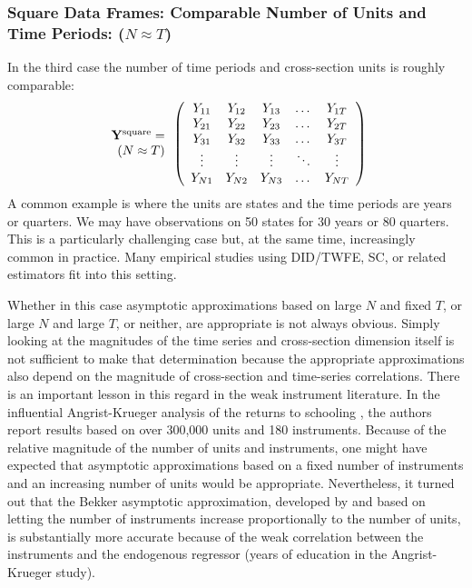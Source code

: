 \documentclass[letterpaper,12pt,leqno]{article}
\newcommand{\squ}{{\rm square}}
\newcommand{\by}{{\bf Y}}
\begin{document}
\subsubsection{Square Data Frames: Comparable Number of Units and Time Periods: ($N\approx T$)}
In the third case  the number of time periods and cross-section units is roughly comparable:
\[ \begin{array}{r}\by^\squ=\\ 
(N\approx T)
\end{array}
\left(
\begin{array}{ccccccc}
	Y_{11} & Y_{12} & Y_{13}  & \dots & Y_{1T} \\
	Y_{21}  & Y_{22} & Y_{23}   & \dots & Y_{2T}  \\
	Y_{31}  & Y_{32} & Y_{33}   & \dots & Y_{3T}  \\
	\vdots   &  \vdots & \vdots &\ddots &\vdots \\
	Y_{N1}  & Y_{N2} & Y_{N3}   & \dots & Y_{NT}  \\
\end{array}
\right)\]
A common example is where the units are states and the time periods are years or quarters. We may have observations on 50 states for 30 years or 80 quarters. This is a particularly challenging case but, at the same time, increasingly common in practice. Many empirical studies using DID/TWFE, SC, or related estimators fit into this setting.

Whether in this case asymptotic approximations based on large $N$ and fixed $T$, or large $N$ and large $T$, or neither, are appropriate is not always obvious. 
Simply looking at the magnitudes of the time series and cross-section dimension itself is not sufficient to make that determination because the appropriate approximations also depend on the magnitude of cross-section and time-series correlations. There is an important lesson in this regard in the weak instrument literature. In the influential Angrist-Krueger analysis of the returns to schooling \citep{angristkrueger1991}, the authors report results based on over 300,000 units and 180 instruments. Because of the relative magnitude of the number of units and instruments, one might have expected that asymptotic approximations based on a fixed number of instruments and an increasing number of units would be appropriate. Nevertheless, it turned out that the Bekker asymptotic approximation, developed by \citep{bekker1994alternative} and based on letting the number of instruments increase proportionally to the number of units, is substantially more accurate because of the weak correlation between the instruments and the endogenous regressor (years of education in the Angrist-Krueger study).
\end{document}
